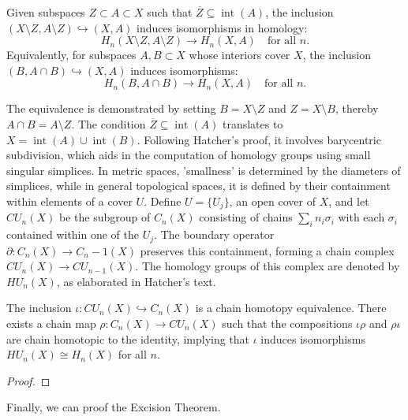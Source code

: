 \begin{theorem}
	{\cite[\S 2.20]{hatcher2005algebraic} \label{excisiontheorem} Given subspaces $Z \subset A \subset X$ such that $\overline{Z}\subseteq \operatorname{int}(A)$, the inclusion $(X\setminus Z, A\setminus Z) \hookrightarrow (X, A)$ induces isomorphisms in homology}:
	\[
		H_{n}(X\setminus Z, A\setminus Z) \to H_{n}(X, A) \quad \text{for all }n.
	\]
	Equivalently, for subspaces $A, B \subset X$ whose interiors cover $X$, the
	inclusion $(B, A \cap B) \hookrightarrow (X, A)$ induces isomorphisms:
	\[
		H_{n}(B, A \cap B) \to H_{n}(X, A) \quad \text{for all }n.
	\]
\end{theorem}

The equivalence is demonstrated by setting $B = X \setminus Z$ and
$Z = X \setminus B$, thereby $A \cap B = A \setminus Z$. The condition
$\overline{Z}\subseteq \operatorname{int}(A)$ translates to
$X = \operatorname{int}(A) \cup \operatorname{int}(B)$. Following Hatcher's proof,
it involves barycentric subdivision, which aids in the computation of homology groups
using small singular simplices. In metric spaces, 'smallness' is determined by the
diameters of simplices, while in general topological spaces, it is defined by their
containment within elements of a cover $U$. Define $U = \{U_{j}\}$, an open cover
of $X$, and let $CU_{n}(X)$ be the subgroup of $C_{n}(X)$ consisting of chains
$\sum_{i} n_{i} \sigma_{i}$ with each $\sigma_{i}$ contained within one of the
$U_{j}$. The boundary operator $\partial: C_{n}(X) \to C_{n}-1(X)$ preserves this
containment, forming a chain complex $CU_{n}(X) \to CU_{n-1}(X)$. The homology groups
of this complex are denoted by $HU_{n}(X)$, as elaborated in Hatcher's text.

\begin{proposition}
	{\cite[\S 2.21]{hatcher2005algebraic}} The inclusion $\iota : CU_{n}(X) \hookrightarrow
	C_{n}(X)$ is a chain homotopy equivalence. There exists a chain map
	$\rho : C_{n}(X) \to CU_{n}(X)$ such that the compositions $\iota \rho$ and
	$\rho \iota$ are chain homotopic to the identity, implying that $\iota$ induces
	isomorphisms $HU_{n}(X) \cong H_{n}(X)$ for all $n$.
\end{proposition}

\begin{proof}
\end{proof}

Finally, we can proof the Excision Theorem.

